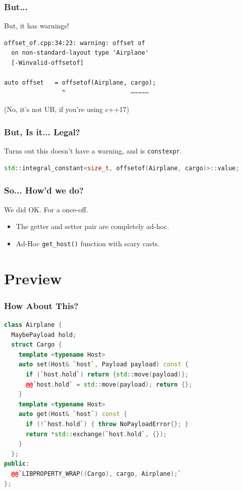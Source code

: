 \documentclass{beamer}
\def\code#1{\texttt{#1}}
\newcommand{\nl}{\vspace{0.2\baselineskip}}
\begin{document}
\begin{frame}[fragile]
\frametitle{But...}
\begin{center}
  But, it has warnings!
\end{center}
\begin{verbatim}
offset_of.cpp:34:23: warning: offset of
  on non-standard-layout type 'Airplane'
  [-Winvalid-offsetof]

auto offset   = offsetof(Airplane, cargo);
                ^                  ~~~~~
\end{verbatim}
(No, it's not UB, if you're using c++17)
\end{frame}


\begin{frame}[fragile]
\frametitle{But, Is it... Legal?}
\begin{center}
  Turns out this doesn't have a warning, and is \code{constexpr}.
\end{center}
\begin{lstlisting}[language=cpp]
  std::integral_constant<size_t, offsetof(Airplane, cargo)>::value;
\end{lstlisting}
\end{frame}


\begin{frame}[fragile]
\frametitle{So... How'd we do?}
\begin{center}
  We did OK. For a once-off.\nl\nl

\begin{itemize}
  \item The getter and setter pair are completely ad-hoc.
  \item Ad-Hoc \code{get\_host()} function with scary casts.
\end{itemize}

\end{center}
\end{frame}

\section{Preview}
\begin{frame}[fragile]
\frametitle{How About This?}
\begin{lstlisting}[language=cpp]
class Airplane {
  MaybePayload hold;
  struct Cargo {
    template <typename Host>
    auto set(Host& `host`, Payload payload) const {
      if (`host.hold`) return {std::move(payload)};
      @@`host.hold` = std::move(payload); return {};
    }
    template <typename Host>
    auto get(Host& `host`) const {
      if (!`host.hold`) { throw NoPayloadError{}; }
      return *std::exchange(`host.hold`, {});
    }
  };
public:
  @@`LIBPROPERTY_WRAP((Cargo), cargo, Airplane);`
};
\end{lstlisting}
\end{frame}
\end{document}
